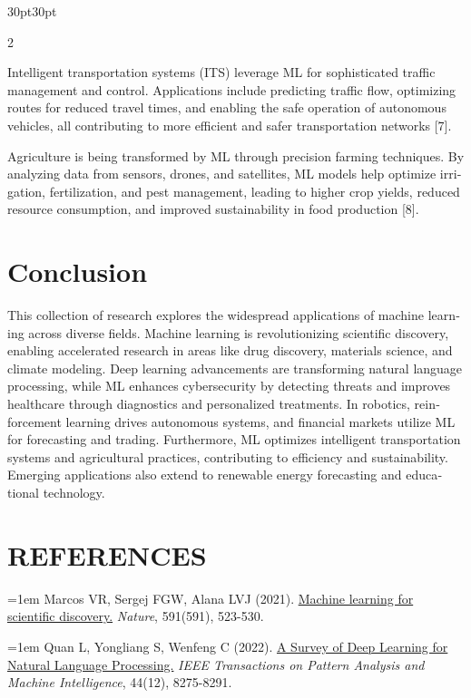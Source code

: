 \documentclass{article}
\begin{document}
\begin{adjustwidth}{30pt}{30pt}
\begin{multicols}{2}
\begin{otherlanguage}{english}
Intelligent transportation systems (ITS) leverage ML for sophisticated traffic management and control. Applications include predicting traffic flow, optimizing routes for reduced travel times, and enabling the safe operation of autonomous vehicles, all contributing to more efficient and safer transportation networks [7].

Agriculture is being transformed by ML through precision farming techniques. By analyzing data from sensors, drones, and satellites, ML models help optimize irrigation, fertilization, and pest management, leading to higher crop yields, reduced resource consumption, and improved sustainability in food production [8].
\end{otherlanguage}

\vspace*{-0.2cm}
\section*{Conclusion}
\vspace*{-0.4cm}

\begin{otherlanguage}{english}
This collection of research explores the widespread applications of machine learning across diverse fields. Machine learning is revolutionizing scientific discovery, enabling accelerated research in areas like drug discovery, materials science, and climate modeling. Deep learning advancements are transforming natural language processing, while ML enhances cybersecurity by detecting threats and improves healthcare through diagnostics and personalized treatments. In robotics, reinforcement learning drives autonomous systems, and financial markets utilize ML for forecasting and trading. Furthermore, ML optimizes intelligent transportation systems and agricultural practices, contributing to efficiency and sustainability. Emerging applications also extend to renewable energy forecasting and educational technology.
\end{otherlanguage}

\vspace*{-0.2cm}
\section*{REFERENCES}
\vspace*{-0.4cm}

{
\noindent\hangindent=1em
Marcos VR, Sergej FGW, Alana LVJ (2021).
    \href{https://pubmed.ncbi.nlm.nih.gov/33753790/}{Machine learning for scientific discovery.}
\textit{Nature},
    591(591), 523-530.

\noindent\hangindent=1em
Quan L, Yongliang S, Wenfeng C (2022).
    \href{https://ieeexplore.ieee.org/abstract/document/9530071/}{A Survey of Deep Learning for Natural Language Processing.}
\textit{IEEE Transactions on Pattern Analysis and Machine Intelligence},
    44(12), 8275-8291.

}

\end{multicols}
\end{adjustwidth}
\end{document}
